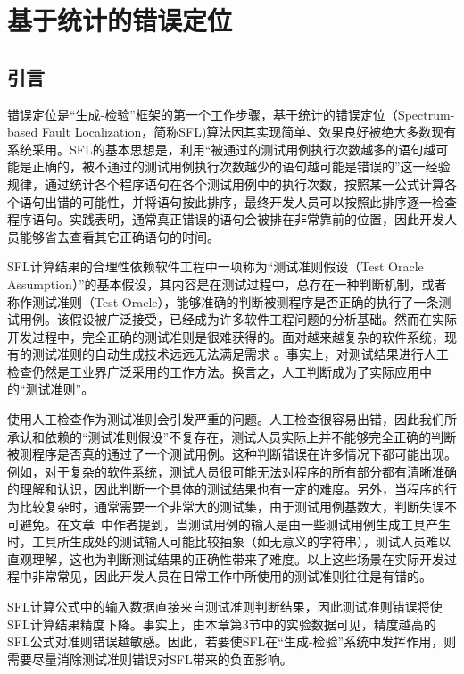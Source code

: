 \chapter{基于统计的错误定位}
\label{cha:fl}

\section{引言}
\label{sec: introduction}
错误定位是“生成-检验”框架的第一个工作步骤，基于统计的错误定位（Spectrum-based Fault Localization，简称SFL)算法因其实现简单、效果良好被绝大多数现有系统采用。SFL的基本思想是，利用“被通过的测试用例执行次数越多的语句越可能是正确的，被不通过的测试用例执行次数越少的语句越可能是错误的”这一经验规律，通过统计各个程序语句在各个测试用例中的执行次数，按照某一公式计算各个语句出错的可能性，并将语句按此排序，最终开发人员可以按照此排序逐一检查程序语句。实践表明，通常真正错误的语句会被排在非常靠前的位置，因此开发人员能够省去查看其它正确语句的时间。

SFL计算结果的合理性依赖软件工程中一项称为“测试准则假设（Test Oracle Assumption）”的基本假设，其内容是在测试过程中，总存在一种判断机制，或者称作测试准则（Test Oracle），能够准确的判断被测程序是否正确的执行了一条测试用例\cite{Peters:1994:GTO:186258.186508}。该假设被广泛接受，已经成为许多软件工程问题的分析基础。然而在实际开发过程中，完全正确的测试准则是很难获得的。面对越来越复杂的软件系统，现有的测试准则的自动生成技术远远无法满足需求 \cite{harman2013comprehensive}。事实上，对测试结果进行人工检查仍然是工业界广泛采用的工作方法\cite{manolache2001software}。换言之，人工判断成为了实际应用中的“测试准则”。

使用人工检查作为测试准则会引发严重的问题。人工检查很容易出错\cite{manolache2001software}，因此我们所承认和依赖的“测试准则假设”不复存在，测试人员实际上并不能够完全正确的判断被测程序是否真的通过了一个测试用例。这种判断错误在许多情况下都可能出现。例如，对于复杂的软件系统，测试人员很可能无法对程序的所有部分都有清晰准确的理解和认识，因此判断一个具体的测试结果也有一定的难度。另外，当程序的行为比较复杂时，通常需要一个非常大的测试集，由于测试用例基数大，判断失误不可避免。在文章~\cite{mcminn2010reducing}中作者提到，当测试用例的输入是由一些测试用例生成工具产生时，工具所生成处的测试输入可能比较抽象（如无意义的字符串），测试人员难以直观理解，这也为判断测试结果的正确性带来了难度。以上这些场景在实际开发过程中非常常见，因此开发人员在日常工作中所使用的测试准则往往是有错的。

SFL计算公式中的输入数据直接来自测试准则判断结果，因此测试准则错误将使SFL计算结果精度下降。事实上，由本章第3节中的实验数据可见，精度越高的SFL公式对准则错误越敏感。因此，若要使SFL在“生成-检验”系统中发挥作用，则需要尽量消除测试准则错误对SFL带来的负面影响。


